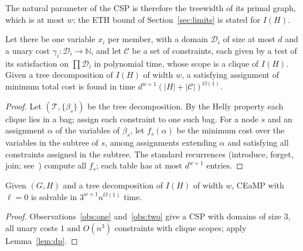 The natural parameter of the CSP is therefore the treewidth of its primal graph, which is at most $w$; the ETH bound of Section~\ref{sec:limits} is stated for $I(H)$.

\begin{lemma}\label{lem:dp}
Let there be one variable $x_i$ per member, with a domain $\mathcal D_i$ of size at most $d$ and a unary cost $\gamma_i:\mathcal D_i\to\mathbb N$, and let $\mathcal C$ be a set of constraints, each given by a test of its satisfaction on $\prod\mathcal D_i$ in polynomial time, whose scope is a clique of $I(H)$. Given a tree decomposition of $I(H)$ of width $w$, a satisfying assignment of minimum total cost is found in time $d^{w+1}(|H|+|\mathcal C|)^{O(1)}$.
\end{lemma}
\begin{proof}
Let $(\mathcal T,\{\beta_s\})$ be the tree decomposition. By the Helly property each clique lies in a bag; assign each constraint to one such bag. For a node $s$ and an assignment $\alpha$ of the variables of $\beta_s$, let $f_s(\alpha)$ be the minimum cost over the variables in the subtree of $s$, among assignments extending $\alpha$ and satisfying all constraints assigned in the subtree. The standard recurrences (introduce, forget, join; see~\cite{Cygan15}) compute all $f_s$; each table has at most $d^{w+1}$ entries.
\end{proof}

\begin{theorem}\label{thm:l0}
Given $(G,H)$ and a tree decomposition of $I(H)$ of width $w$, CEaMP with $\ell=0$ is solvable in $3^{w+1}n^{O(1)}$ time.
\end{theorem}
\begin{proof}
Observations~\ref{obs:one} and~\ref{obs:two} give a CSP with domains of size $3$, all unary costs $1$ and $O(n^3)$ constraints with clique scopes; apply Lemma~\ref{lem:dp}.
\end{proof}

